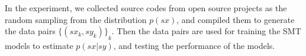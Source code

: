 \documentclass[senior,final,11pt]{iscs-thesis}
\newcommand{\argmax}{\mathop{\rm arg\,max}\limits}
\begin{document}
In the experiment, we collected source codes from open source projects as the random sampling from the distribution $ p(sx) $, 
and compiled them to generate the data pairs $ {\{(sx_k,sy_k)\}}_k $.
Then the data pairs are used for training the SMT models to estimate $p(sx|sy)$, and testing the performance of the models.




\end{document}
